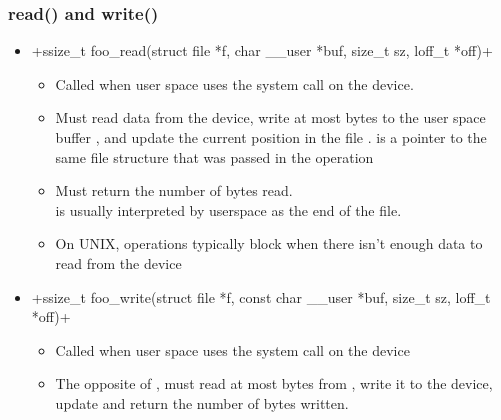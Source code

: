 \begin{frame}[fragile]
  \frametitle{read() and write()}
  \begin{itemize}
  \item {}+ssize_t foo_read(struct file *f, char __user *buf, size_t sz, loff_t *off)+
    \begin{itemize}
    \item Called when user space uses the  system call on
      the device.
    \item Must read data from the device, write at most 
      bytes to the user space buffer , and update the
      current position in the file .  is a pointer
      to the same file structure that was passed in the 
      operation
    \item Must return the number of bytes read.\\
	   is usually interpreted by userspace as the end of
          the file.
    \item On UNIX,  operations typically block when there
      isn't enough data to read from the device
    \end{itemize}
  \item {}+ssize_t foo_write(struct file *f, const char __user *buf, size_t sz, loff_t *off)+
    \begin{itemize}
    \item Called when user space uses the  system call
      on the device
    \item The opposite of , must read at most 
      bytes from , write it to the device, update 
      and return the number of bytes written.
    \end{itemize}
  \end{itemize}
\end{frame}

